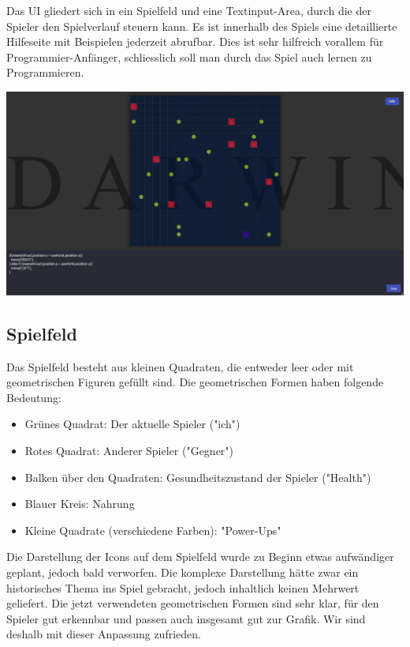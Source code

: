 \documentclass[11pt,a4paper,titlepage]{article}
\begin{document}
Das UI gliedert sich in ein Spielfeld und eine Textinput-Area, durch die der Spieler den Spielverlauf steuern kann. Es ist innerhalb des Spiels eine detaillierte Hilfeseite mit Beispielen jederzeit abrufbar. Dies ist sehr hilfreich vorallem für Programmier-Anfänger, schliesslich soll man durch das Spiel auch lernen zu Programmieren.

\includegraphics[width=\textwidth]{darwin-gameplay.png}


\subsection{Spielfeld}

Das Spielfeld besteht aus kleinen Quadraten, die entweder leer oder mit geometrischen Figuren gefüllt sind. Die geometrischen Formen haben folgende Bedeutung:
\begin{itemize}
\item Grünes Quadrat: Der aktuelle Spieler ("ich")
\item Rotes Quadrat: Anderer Spieler ("Gegner")
\item Balken über den Quadraten: Gesundheitszustand der Spieler ("Health")
\item Blauer Kreis: Nahrung
\item Kleine Quadrate (verschiedene Farben): "Power-Ups"
\end{itemize}

Die Darstellung der Icons auf dem Spielfeld wurde zu Beginn etwas aufwändiger geplant, jedoch bald verworfen. Die komplexe Darstellung hätte zwar ein historisches Thema ins Spiel gebracht, jedoch inhaltlich keinen Mehrwert geliefert. Die jetzt verwendeten geometrischen Formen sind sehr klar, für den Spieler gut erkennbar und passen auch insgesamt gut zur Grafik. Wir sind deshalb mit dieser Anpassung zufrieden.
\end{document}
